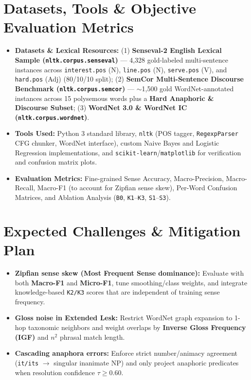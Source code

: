 \documentclass[11pt,a4paper]{article}
\begin{document}
\section{Datasets, Tools \& Objective Evaluation Metrics}
\begin{itemize}
    \item \textbf{Datasets \& Lexical Resources:} (1) \textbf{Senseval-2 English Lexical Sample (\texttt{nltk.corpus.senseval})} --- 4,328 gold-labeled multi-sentence instances across \texttt{interest.pos} (N), \texttt{line.pos} (N), \texttt{serve.pos} (V), and \texttt{hard.pos} (Adj) (80/10/10 split); (2) \textbf{SemCor Multi-Sentence Discourse Benchmark (\texttt{nltk.corpus.semcor})} --- $\sim$1,500 gold WordNet-annotated instances across 15 polysemous words plus a \textbf{Hard Anaphoric \& Discourse Subset}; (3) \textbf{WordNet 3.0 \& WordNet IC (\texttt{nltk.corpus.wordnet})}.
    \item \textbf{Tools Used:} Python 3 standard library, \texttt{nltk} (POS tagger, \texttt{RegexpParser} CFG chunker, WordNet interface), custom Naive Bayes and Logistic Regression implementations, and \texttt{scikit-learn}/\texttt{matplotlib} for verification and confusion matrix plots.
    \item \textbf{Evaluation Metrics:} Fine-grained Sense Accuracy, Macro-Precision, Macro-Recall, Macro-F1 (to account for Zipfian sense skew), Per-Word Confusion Matrices, and Ablation Analysis (\texttt{B0}, \texttt{K1}--\texttt{K3}, \texttt{S1}--\texttt{S3}).
\end{itemize}

\section{Expected Challenges \& Mitigation Plan}
\begin{itemize}
    \item \textbf{Zipfian sense skew (Most Frequent Sense dominance):} Evaluate with both \textbf{Macro-F1} and \textbf{Micro-F1}, tune smoothing/class weights, and integrate knowledge-based \texttt{K2/K3} scores that are independent of training sense frequency.
    \item \textbf{Gloss noise in Extended Lesk:} Restrict WordNet graph expansion to 1-hop taxonomic neighbors and weight overlaps by \textbf{Inverse Gloss Frequency (IGF)} and $n^2$ phrasal match length.
    \item \textbf{Cascading anaphora errors:} Enforce strict number/animacy agreement (\texttt{it/its} $\to$ singular inanimate NP) and only project anaphoric predicates when resolution confidence $\tau \ge 0.60$.
\end{itemize}
\end{document}
